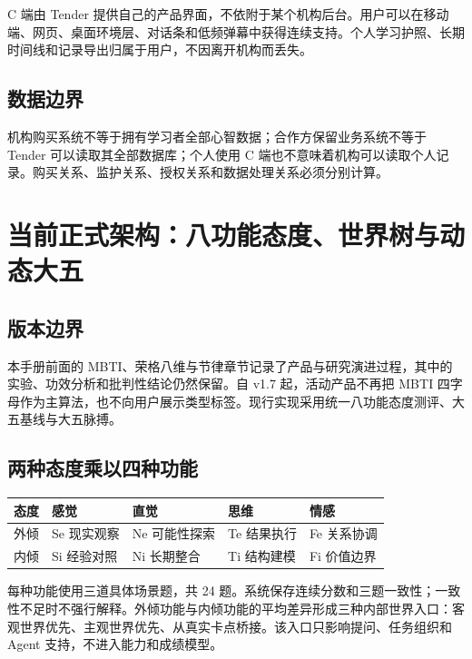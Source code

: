 \documentclass[UTF8,a4paper,11pt]{ctexart}
\begin{document}
C 端由 Tender 提供自己的产品界面，不依附于某个机构后台。用户可以在移动端、网页、桌面环境层、对话条和低频弹幕中获得连续支持。个人学习护照、长期时间线和记录导出归属于用户，不因离开机构而丢失。

\subsection{数据边界}

机构购买系统不等于拥有学习者全部心智数据；合作方保留业务系统不等于 Tender 可以读取其全部数据库；个人使用 C 端也不意味着机构可以读取个人记录。购买关系、监护关系、授权关系和数据处理关系必须分别计算。


\section{当前正式架构：八功能态度、世界树与动态大五}

\subsection{版本边界}

本手册前面的 MBTI、荣格八维与节律章节记录了产品与研究演进过程，其中的实验、功效分析和批判性结论仍然保留。自 v1.7 起，活动产品不再把 MBTI 四字母作为主算法，也不向用户展示类型标签。现行实现采用统一八功能态度测评、大五基线与大五脉搏。

\subsection{两种态度乘以四种功能}

\begin{center}
\begin{longtable}{@{}p{3.0cm}p{2.5cm}p{2.5cm}p{2.5cm}p{2.5cm}@{}}
\toprule
\textbf{态度} & \textbf{感觉} & \textbf{直觉} & \textbf{思维} & \textbf{情感} \\
\midrule
外倾 & Se 现实观察 & Ne 可能性探索 & Te 结果执行 & Fe 关系协调 \\
内倾 & Si 经验对照 & Ni 长期整合 & Ti 结构建模 & Fi 价值边界 \\
\bottomrule
\end{longtable}
\end{center}

每种功能使用三道具体场景题，共 24 题。系统保存连续分数和三题一致性；一致性不足时不强行解释。外倾功能与内倾功能的平均差异形成三种内部世界入口：客观世界优先、主观世界优先、从真实卡点桥接。该入口只影响提问、任务组织和 Agent 支持，不进入能力和成绩模型。
\end{document}
